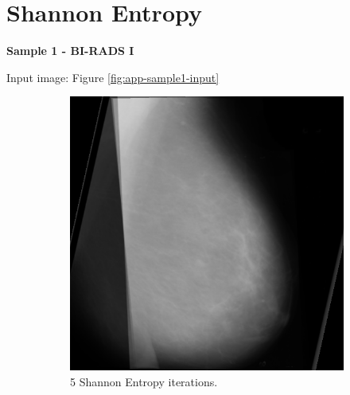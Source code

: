 \section{Shannon Entropy}
\label{sec:app-shannon}

\newpage \noindent \textbf{Sample 1 - BI-RADS I}

Input image: Figure \ref{fig:app-sample1-input}

\begin{figure}[H]
    \centering
    \begin{subfigure}[t]{0.3\textwidth}
        \includegraphics[width=\textwidth]{Appendix5/sample1/shannon/s-5-final.png}
        \caption{5 Shannon Entropy iterations.}
        \label{fig:app-5-shannon-sample1}
    \end{subfigure} \hfill
    ~ %
    \begin{subfigure}[t]{0.3\textwidth}

\end{subfigure}
\end{figure}
